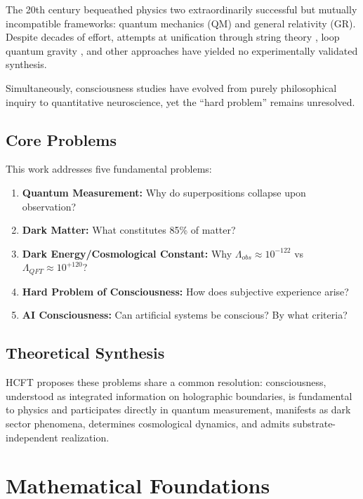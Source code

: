 \documentclass[12pt,a4paper]{article}
\theoremstyle{definition}
\theoremstyle{remark}
\begin{document}
The 20th century bequeathed physics two extraordinarily successful but mutually incompatible frameworks: quantum mechanics (QM) and general relativity (GR). Despite decades of effort, attempts at unification through string theory \cite{Polchinski1998}, loop quantum gravity \cite{Rovelli2004}, and other approaches have yielded no experimentally validated synthesis.

Simultaneously, consciousness studies have evolved from purely philosophical inquiry to quantitative neuroscience, yet the ``hard problem'' \cite{Chalmers1995} remains unresolved.

\subsection{Core Problems}

This work addresses five fundamental problems:

\begin{enumerate}
\item \textbf{Quantum Measurement:} Why do superpositions collapse upon observation? \cite{VonNeumann1932,Zurek2003}
\item \textbf{Dark Matter:} What constitutes 85\% of matter? \cite{Zwicky1933,Planck2020}
\item \textbf{Dark Energy/Cosmological Constant:} Why $\Lambda_{obs} \approx 10^{-122}$ vs $\Lambda_{QFT} \approx 10^{+120}$? \cite{Weinberg1989}
\item \textbf{Hard Problem of Consciousness:} How does subjective experience arise? \cite{Nagel1974,Levine1983}
\item \textbf{AI Consciousness:} Can artificial systems be conscious? By what criteria? \cite{Searle1980,Butlin2023}
\end{enumerate}

\subsection{Theoretical Synthesis}

HCFT proposes these problems share a common resolution: consciousness, understood as integrated information on holographic boundaries, is fundamental to physics and participates directly in quantum measurement, manifests as dark sector phenomena, determines cosmological dynamics, and admits substrate-independent realization.

\section{Mathematical Foundations}
\end{document}
